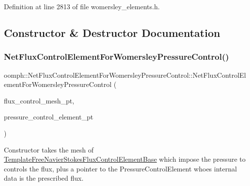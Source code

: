 Definition at line 2813 of file womersley\+\_\+elements.\+h.



\subsection{Constructor \& Destructor Documentation}
\mbox{\label{classoomph_1_1NetFluxControlElementForWomersleyPressureControl_a395d5cf74e6e8c4dc581b52048963f38}} 
\subsubsection{\texorpdfstring{Net\+Flux\+Control\+Element\+For\+Womersley\+Pressure\+Control()}{NetFluxControlElementForWomersleyPressureControl()}\hspace{0.1cm}{\footnotesize\ttfamily [1/2]}}
{\footnotesize\ttfamily oomph\+::\+Net\+Flux\+Control\+Element\+For\+Womersley\+Pressure\+Control\+::\+Net\+Flux\+Control\+Element\+For\+Womersley\+Pressure\+Control (\begin{DoxyParamCaption}\item[{\hyperlink{classoomph_1_1Mesh}{Mesh} $\ast$}]{flux\+\_\+control\+\_\+mesh\+\_\+pt,  }\item[{\hyperlink{classoomph_1_1NavierStokesWomersleyPressureControlElement}{Navier\+Stokes\+Womersley\+Pressure\+Control\+Element} $\ast$}]{pressure\+\_\+control\+\_\+element\+\_\+pt }\end{DoxyParamCaption})\hspace{0.3cm}{\ttfamily [inline]}}



Constructor takes the mesh of \hyperlink{classoomph_1_1TemplateFreeNavierStokesFluxControlElementBase}{Template\+Free\+Navier\+Stokes\+Flux\+Control\+Element\+Base} which impose the pressure to controls the flux, plus a pointer to the Pressure\+Control\+Element whoes internal data is the prescribed flux. 



